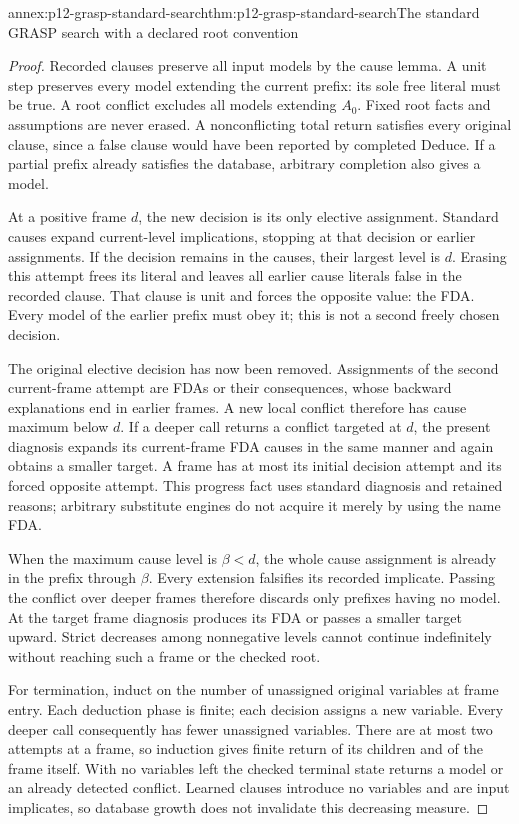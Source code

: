 \begin{annexitem}{annex:p12-grasp-standard-search}{thm:p12-grasp-standard-search}{The standard GRASP search with a declared root convention}
\begin{proof}
Recorded clauses preserve all input models by the cause lemma.  A unit step
preserves every model extending the current prefix: its sole free literal
must be true.  A root conflict excludes all models extending \(A_0\).
Fixed root facts and assumptions are never erased.  A nonconflicting total
return satisfies every original clause, since a false clause would have
been reported by completed Deduce.  If a partial prefix already satisfies
the database, arbitrary completion also gives a model.

At a positive frame \(d\), the new decision is its only elective assignment.
Standard causes expand current-level implications, stopping at that decision
or earlier assignments.  If the decision remains in the causes, their largest
level is \(d\).  Erasing this attempt frees its literal and leaves all
earlier cause literals false in the recorded clause.  That clause is unit
and forces the opposite value: the FDA.  Every model of the earlier prefix
must obey it; this is not a second freely chosen decision.

The original elective decision has now been removed.  Assignments of the
second current-frame attempt are FDAs or their consequences, whose backward
explanations end in earlier frames.  A new local conflict therefore has
cause maximum below \(d\).  If a deeper call returns a conflict targeted
at \(d\), the present diagnosis expands its current-frame FDA causes in
the same manner and again obtains a smaller target.  A frame has at most
its initial decision attempt and its forced opposite attempt.  This progress
fact uses standard diagnosis and retained reasons; arbitrary substitute
engines do not acquire it merely by using the name FDA.

When the maximum cause level is \(\beta<d\), the whole cause assignment
is already in the prefix through \(\beta\).  Every extension falsifies
its recorded implicate.  Passing the conflict over deeper frames therefore
discards only prefixes having no model.  At the target frame diagnosis
produces its FDA or passes a smaller target upward.  Strict decreases among
nonnegative levels cannot continue indefinitely without reaching such a
frame or the checked root.

For termination, induct on the number of unassigned original variables at
frame entry.  Each deduction phase is finite; each decision assigns a new
variable.  Every deeper call consequently has fewer unassigned variables.
There are at most two attempts at a frame, so induction gives finite return
of its children and of the frame itself.  With no variables left the checked
terminal state returns a model or an already detected conflict.  Learned
clauses introduce no variables and are input implicates, so database growth
does not invalidate this decreasing measure.


\end{proof}
\end{annexitem}
